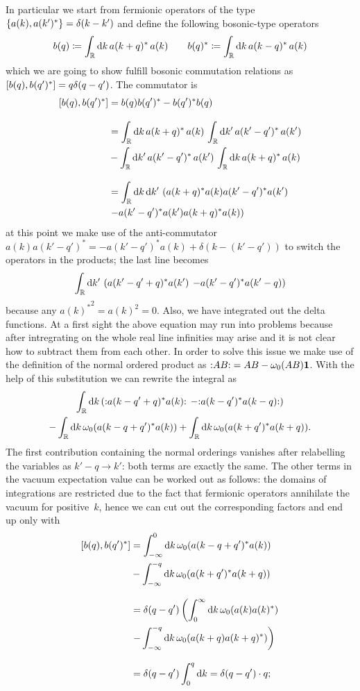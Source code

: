  \bigskip
 \noindent In particular we start from fermionic operators
 of the type $\{a(k),a(k')^*\}=\delta(k-k')$
 and define the following bosonic-type operators
 \[
 b(q)\coloneqq\int_{\mathbb{R}}\textrm{d} k\,a(k+q)^*\,a(k)\qquad
 b(q)^*\coloneqq\int_{\mathbb{R}}\textrm{d} k\,a(k-q)^*\,a(k)
 \]
 which we are going to show fulfill bosonic
 commutation relations as $[b(q),b(q')^*]
 =q\delta(q-q')$. The commutator is
 \begin{align*}
 [b(q),b(q')^*]&=b(q)b(q')^*-b(q')^*b(q)\\[2ex]
 &=\int_{\mathbb{R}}\textrm{d} k\,a(k+q)^*\,a(k)\,
   \int_{\mathbb{R}}\textrm{d} k'\,a(k'-q')^*\,a(k')\\
   &-\int_{\mathbb{R}}\textrm{d} k'\,a(k'-q')^*\,a(k')\,
   \int_{\mathbb{R}}\textrm{d} k\,a(k+q)^*\,a(k)\\[2ex]
 &=\int_{\mathbb{R}}\textrm{d} k\,\textrm{d} k'\,
  \left(a(k+q)^*a(k)a(k'-q')^*a(k')\right. \\
  &\left.-a(k'-q')^*a(k')a(k+q)^*a(k)\right)
 \end{align*}
 at this point we make use of the anti-commutator 
 $a(k)a(k'-q')^*=-a(k'-q')^*a(k)+\delta(k-(k'-q'))$ to
 switch the operators in the products; the last line becomes
 \[
 \int_{\mathbb{R}}\textrm{d} k'\,\left(a(k'-q'+q)^*a(k')\right. 
 \left.-a(k'-q')^*a(k'-q)\right)
 \]
 because any ${a(k)^*}^2={a(k)}^2=0$. Also, we have integrated
 out the delta functions. At a first sight the above equation
 may run into problems because after intregrating on the
 whole real line infinities may arise and it is not clear
 how to subtract them from each other. In order to solve
 this issue we make use of the definition of the normal
 ordered product as $\wick{AB}=AB-\vac(AB)\bm{1}$. With the
 help of this substitution we can rewrite the integral as
 \begin{multline*}
 \int_{\R}\dd k\left(\wick{a(k-q'+q)^*a(k)}\right. 
               \left. - \wick{a(k-q')^*a(k-q)}\right)\\
 -\int_{\R}\dd k\,\vac(a(k-q+q')^*a(k))+\int_{\R}\dd k\,
 \vac(a(k+q')^*a(k+q)).
 \end{multline*}
 The first contribution containing the normal
 orderings vanishes after relabelling the variables
 as $k'-q\to k'$: both terms are exactly the same.
 The other terms in the vacuum expectation value
 can be worked out as follows: the domains of
 integrations are restricted due to the fact
 that fermionic operators annihilate the vacuum
 for positive~$k$, hence we can cut out the
 corresponding factors and end up only with 
 \begin{align*}
 [b(q),b(q')^*]&=\int_{-\infty}^0 \textrm{d} k\,
 \omega_0(a(k-q+q')^*a(k))\\
 &-\int_{-\infty}^{-q}\textrm{d} k\,\omega_0(a(k+q')^*a(k+q))\\[2ex]
 &= \delta(q-q')\left(\int_0^{\infty}\textrm{d} k\,\omega_0(a(k)a(k)^*)\right. \\
 &\left.-\int_{-\infty}^{-q}\textrm{d} k\,\omega_0(a(k+q)a(k+q)^*)\right)\\[2ex]
 &=\delta(q-q')\int_0^{q}\textrm{d} k=\delta(q-q')\cdot q;
 \end{align*}

